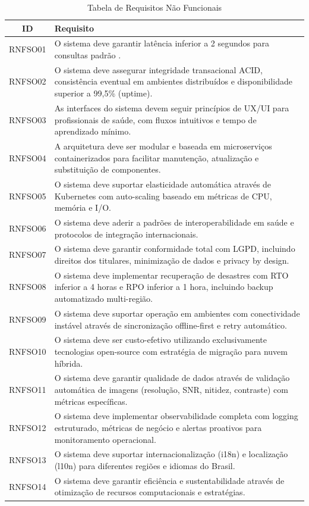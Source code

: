 \begin{table}[H]
    \centering
    \small 
    \begin{tabular}{|c|p{12cm}|}
    \hline
    \textbf{ID} & \textbf{Requisito} \\ \hline
    RNFSO01 & O sistema deve garantir latência inferior a 2 segundos para consultas padrão . \\ \hline
    RNFSO02 & O sistema deve assegurar integridade transacional ACID, consistência eventual em ambientes distribuídos e disponibilidade superior a 99,5\% (uptime). \\ \hline
    RNFSO03 & As interfaces do sistema devem seguir princípios de UX/UI para profissionais de saúde, com fluxos intuitivos e tempo de aprendizado mínimo. \\ \hline
    RNFSO04 & A arquitetura deve ser modular e baseada em microserviços containerizados para facilitar manutenção, atualização e substituição de componentes. \\ \hline
    RNFSO05 & O sistema deve suportar elasticidade automática através de Kubernetes com auto-scaling baseado em métricas de CPU, memória e I/O. \\ \hline
    RNFSO06 & O sistema deve aderir a padrões de interoperabilidade em saúde e protocolos de integração internacionais. \\ \hline
    RNFSO07 & O sistema deve garantir conformidade total com LGPD, incluindo direitos dos titulares, minimização de dados e privacy by design. \\ \hline
    RNFSO08 & O sistema deve implementar recuperação de desastres com RTO inferior a 4 horas e RPO inferior a 1 hora, incluindo backup automatizado multi-região. \\ \hline
    RNFSO09 & O sistema deve suportar operação em ambientes com conectividade instável através de sincronização offline-first e retry automático. \\ \hline
    RNFSO10 & O sistema deve ser custo-efetivo utilizando exclusivamente tecnologias open-source com estratégia de migração para nuvem híbrida. \\ \hline
    RNFSO11 & O sistema deve garantir qualidade de dados através de validação automática de imagens (resolução, SNR, nitidez, contraste) com métricas específicas. \\ \hline
    RNFSO12 & O sistema deve implementar observabilidade completa com logging estruturado, métricas de negócio e alertas proativos para monitoramento operacional. \\ \hline
    RNFSO13 & O sistema deve suportar internacionalização (i18n) e localização (l10n) para diferentes regiões e idiomas do Brasil. \\ \hline
    RNFSO14 & O sistema deve garantir eficiência e sustentabilidade através de otimização de recursos computacionais e estratégias. \\ \hline
    \end{tabular}
    \caption{Tabela de Requisitos Não Funcionais}
    \label{tab:requisitos_nao_funcionais}
\end{table}

